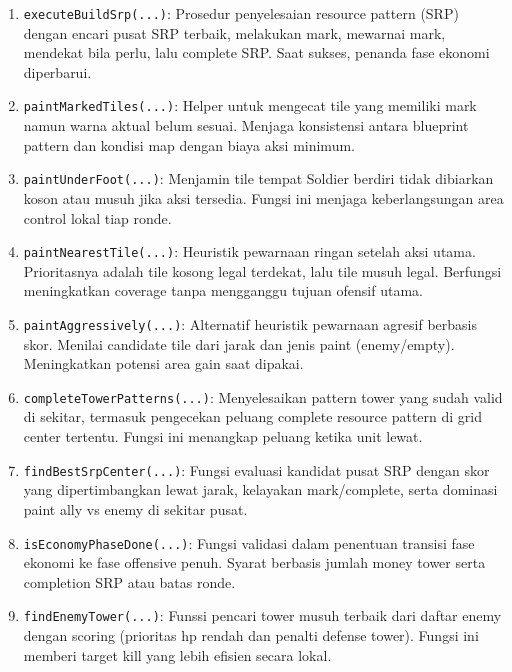 \begin{enumerate}
	\item \texttt{executeBuildSrp(...)}:
	      Prosedur penyelesaian resource pattern (SRP) dengan encari pusat SRP terbaik, melakukan mark, mewarnai mark, mendekat bila perlu, lalu complete SRP. Saat sukses, penanda fase ekonomi diperbarui.

	\item \texttt{paintMarkedTiles(...)}:
	      Helper untuk mengecat tile yang memiliki mark namun warna aktual belum sesuai. Menjaga konsistensi antara blueprint pattern dan kondisi map dengan biaya aksi minimum.

	\item \texttt{paintUnderFoot(...)}:
	      Menjamin tile tempat Soldier berdiri tidak dibiarkan koson atau musuh jika aksi tersedia. Fungsi ini menjaga keberlangsungan area control lokal tiap ronde.

	\item \texttt{paintNearestTile(...)}:
	      Heuristik pewarnaan ringan setelah aksi utama. Prioritasnya adalah tile kosong legal terdekat, lalu tile musuh legal. Berfungsi meningkatkan coverage tanpa mengganggu tujuan ofensif utama.

	\item \texttt{paintAggressively(...)}:
	      Alternatif heuristik pewarnaan agresif berbasis skor. Menilai candidate tile dari jarak dan jenis paint (enemy/empty). Meningkatkan potensi area gain saat dipakai.

	\item \texttt{completeTowerPatterns(...)}:
	      Menyelesaikan pattern tower yang sudah valid di sekitar, termasuk pengecekan peluang complete resource pattern di grid center tertentu. Fungsi ini menangkap peluang ketika unit lewat.

	\item \texttt{findBestSrpCenter(...)}:
	      Fungsi evaluasi kandidat pusat SRP dengan skor yang dipertimbangkan lewat jarak, kelayakan mark/complete, serta dominasi paint ally vs enemy di sekitar pusat.

	\item \texttt{isEconomyPhaseDone(...)}:
	      Fungsi validasi dalam penentuan transisi fase ekonomi ke fase offensive penuh. Syarat berbasis jumlah money tower serta completion SRP atau batas ronde.

	\item \texttt{findEnemyTower(...)}:
	      Funssi pencari tower musuh terbaik dari daftar enemy dengan scoring (prioritas hp rendah dan penalti defense tower). Fungsi ini memberi target kill yang lebih efisien secara lokal.


\end{enumerate}

